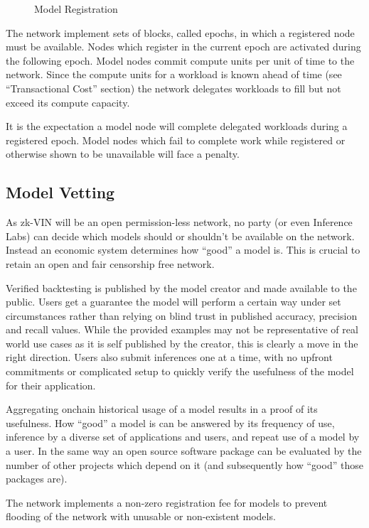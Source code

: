 \documentclass[conference]{IEEEtran}
\begin{document}
\begin{figure}[!ht]
    \centering
    
    \caption{Model Registration}
    \label{fig:Fig 7}
\end{figure}
The network implement sets of blocks, called epochs, in which a registered node must be available. Nodes which register in the current epoch are activated during the following epoch. Model nodes commit compute units per unit of time to the network. Since the compute units for a workload is known ahead of time (see “Transactional Cost” section) the network delegates workloads to fill but not exceed its compute capacity. 

It is the expectation a model node will complete delegated workloads during a registered epoch. Model nodes which fail to complete work while registered or otherwise shown to be unavailable will face a penalty.

\subsection{Model Vetting}

As zk-VIN will be an open permission-less network, no party (or even Inference Labs) can decide which models should or shouldn’t be available on the network. Instead an economic system determines how “good” a model is. This is crucial to retain an open and fair censorship free network.

Verified backtesting is published by the model creator and made available to the public. Users get a guarantee the model will perform a certain way under set circumstances rather than relying on blind trust in published accuracy, precision and recall values. While the provided examples may not be representative of real world use cases as it is self published by the creator, this is clearly a move in the right direction. Users also submit inferences one at a time, with no upfront commitments or complicated setup to quickly verify the usefulness of the model for their application.

Aggregating onchain historical usage of a model results in a proof of its usefulness. How “good” a model is can be answered by its frequency of use, inference by a diverse set of applications and users, and repeat use of a model by a user. In the same way an open source software package can be evaluated by the number of other projects which depend on it (and subsequently how “good” those packages are).

The network implements a non-zero registration fee for models to prevent flooding of the network with unusable or non-existent models.
\end{document}

